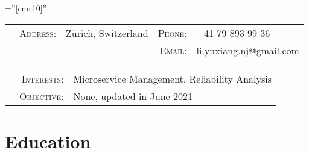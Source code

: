 \documentclass[a4paper,10pt]{article} %
\begin{document}
\pagestyle{empty} %

\font\fb=''[cmr10]'' %


\par{} %
\vspace{0.1cm}

\begin{tabular}{@{}p{0.67cm}rp{8.75cm}rl}
     & \textsc{Address:} & Zürich, Switzerland & \textsc{Phone:} & +41 79 893 99 36                                               \\
     &                   &                     & \textsc{Email:} & \href{mailto:li.yuxiang.nj@gmail.com}{li.yuxiang.nj@gmail.com}
\end{tabular}

\begin{tabular}{p{0.215cm}rl}
     & \textsc{Interests:} & Microservice Management, Reliability Analysis \\
     & \textsc{Objective:} & None, updated in June 2021
\end{tabular}


\section{Education}
\end{document}
